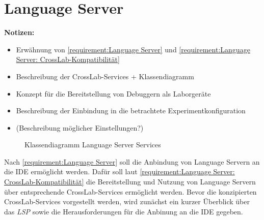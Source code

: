 \section{Language Server}\label{section:konzeption:language-server}

\begin{note}
    \textbf{Notizen:}
    \begin{itemize}
        \item Erwähnung von \autoref{requirement:Language Server} und \autoref{requirement:Language Server: CrossLab-Kompatibilität}
        \item Beschreibung der CrossLab-Services + Klassendiagramm
        \item Konzept für die Bereitstellung von Debuggern als Laborgeräte
        \item Beschreibung der Einbindung in die betrachtete Experimentkonfiguration
        \item (Beschreibung möglicher Einstellungen?)
    \end{itemize}
\end{note}

\begin{figure}[tbp]
    \centering
    \caption{Klassendiagramm Language Server Services}
    \label{figure:klassendiagramm-language-server-services}
\end{figure}

Nach \autoref{requirement:Language Server} soll die Anbindung von Language Servern an die IDE ermöglicht werden. Dafür soll laut \autoref{requirement:Language Server: CrossLab-Kompatibilität} die Bereitstellung und Nutzung von Language Servern über entsprechende CrossLab-Services ermöglicht werden. Bevor die konzipierten CrossLab-Services vorgestellt werden, wird zunächst ein kurzer Überblick über das \textit{\ac{LSP}} \cite{noauthor_language-server-protocol_nodate} sowie die Herausforderungen für die Anbinung an die IDE gegeben.

